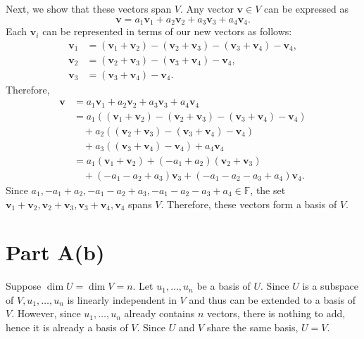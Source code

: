 \documentclass{article}
\begin{document}
Next, we show that these vectors span \(V\). Any vector \(\boldsymbol{v} \in V\) can be expressed as
\[
\boldsymbol{v} = a_1\boldsymbol{v}_1 + a_2\boldsymbol{v}_2 + a_3\boldsymbol{v}_3 + a_4\boldsymbol{v}_4.
\]
Each \(\boldsymbol{v}_i\) can be represented in terms of our new vectors as follows:
\[
\begin{aligned}
\boldsymbol{v}_1 &= (\boldsymbol{v}_1 + \boldsymbol{v}_2) - (\boldsymbol{v}_2 + \boldsymbol{v}_3) - (\boldsymbol{v}_3 + \boldsymbol{v}_4) - \boldsymbol{v}_4, \\
\boldsymbol{v}_2 &= (\boldsymbol{v}_2 + \boldsymbol{v}_3) - (\boldsymbol{v}_3 + \boldsymbol{v}_4) - \boldsymbol{v}_4, \\
\boldsymbol{v}_3 &= (\boldsymbol{v}_3 + \boldsymbol{v}_4) - \boldsymbol{v}_4.
\end{aligned}
\]
Therefore,
\[
\begin{aligned}
\boldsymbol{v} &= a_1\boldsymbol{v}_1 + a_2\boldsymbol{v}_2 + a_3\boldsymbol{v}_3 + a_4\boldsymbol{v}_4 \\
&= a_1((\boldsymbol{v}_1 + \boldsymbol{v}_2) - (\boldsymbol{v}_2 + \boldsymbol{v}_3) - (\boldsymbol{v}_3 + \boldsymbol{v}_4) - \boldsymbol{v}_4) \\
&\quad + a_2((\boldsymbol{v}_2 + \boldsymbol{v}_3) - (\boldsymbol{v}_3 + \boldsymbol{v}_4) - \boldsymbol{v}_4) \\
&\quad + a_3((\boldsymbol{v}_3 + \boldsymbol{v}_4) - \boldsymbol{v}_4) + a_4\boldsymbol{v}_4 \\
&= a_1(\boldsymbol{v}_1 + \boldsymbol{v}_2) + (-a_1 + a_2)(\boldsymbol{v}_2 + \boldsymbol{v}_3) \\
&\quad + (-a_1 - a_2 + a_3)\boldsymbol{v}_3 + (-a_1 - a_2 - a_3 + a_4)\boldsymbol{v}_4.
\end{aligned}
\]
Since \(a_1, -a_1 + a_2, -a_1 - a_2 + a_3, -a_1 - a_2 - a_3 + a_4 \in \mathbb{F}\), the set \(\boldsymbol{v}_1 + \boldsymbol{v}_2, \boldsymbol{v}_2 + \boldsymbol{v}_3, \boldsymbol{v}_3 + \boldsymbol{v}_4, \boldsymbol{v}_4\) spans \(V\). Therefore, these vectors form a basis of \(V\).

\section{Part A(b)}
Suppose $\operatorname{dim} U=\operatorname{dim} V=n$. Let $u_1, \ldots, u_n$ be a basis of $U$. Since $U$ is a subspace of $V, u_1, \ldots, u_n$ is linearly independent in $V$ and thus can be extended to a basis of $V$. However, since $u_1, \ldots, u_n$ already contains $n$ vectors, there is nothing to add, hence it is already a basis of $V$. Since $U$ and $V$ share the same basis, $U=V$.
\end{document}
